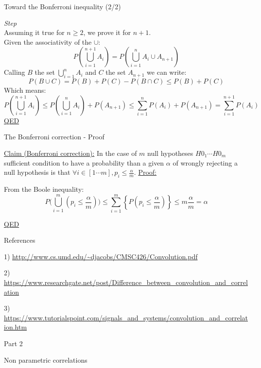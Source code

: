 \documentclass{beamer}
\begin{document}
\begin{frame}
{\centerline{Toward the Bonferroni inequality (2/2) }}
\textit{Step}\\
Assuming it true for $n \ge 2$, we prove it for $n+1$.\\
Given the associativity of the $\cup$:
$$ P({\bigcup_{i \mathop = 1}^{n+1} A_i}) = P({\bigcup_{i \mathop = 1}^{n} A_i \cup A_{n+1}})$$
Calling $B$ the set $\bigcup_{i \mathop = 1}^{n} A_i$ and $C$ the set $ A_{n+1}$ we can write:
$$P(B \cup C) =   P(B) + P (C) - P(B \cap C) \le P(B) + P (C)$$
Which means:
$$ P({\bigcup_{i \mathop = 1}^{n+1} A_i}) \le P({\bigcup_{i \mathop = 1}^{n} A_i}) + P(A_{n+1}) \le \sum_{i \mathop = 1}^n P({A_i}) + P(A_{n+1}) = \sum_{i \mathop = 1}^{n+1} P({A_i})$$
\underline{QED}
\end{frame}


\begin{frame}
{\centerline{The Bonferroni correction - Proof}}
\underline{Claim (Bonferroni correction):} In the case of $m$ null hypotheses $H0_1 \cdots H0_m$ sufficient condition to have a probability than a given $\alpha$ of wrongly rejecting a null hypothesis is that $\forall i \in [1 \cdots m], p_i \leq \frac{\alpha}{m}$.
\newline 
\underline{Proof:}

From the Boole inequality:
$$P \big(\bigcup_{i=1}^{m}(p_i\leq\frac \alpha m ) \big) \leq\sum_{i=1}^{m}\left\{P\left(p_i\leq\frac \alpha m\right)\right\} \leq m \frac \alpha m = \alpha$$

\underline{QED}
\end{frame}

\begin{frame}
{\centerline{References}}

1) \url{http://www.cs.umd.edu/~djacobs/CMSC426/Convolution.pdf}
\newline 

2) \url{https://www.researchgate.net/post/Difference\_between\_convolution\_and\_correlation}
\newline 

3) \url{https://www.tutorialspoint.com/signals\_and\_systems/convolution\_and\_correlation.htm}

\end{frame}

\begin{frame}
{\centerline{Part 2}}

\begin{center}
\Huge Non parametric correlations
\end{center}
\end{frame}
\end{document}
